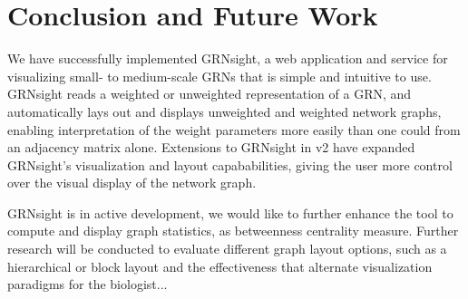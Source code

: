 \documentclass[sigconf,review]{acmart}
\begin{document}
\section{Conclusion and Future Work}
We have successfully implemented GRNsight, a web application and service for visualizing small- to medium-scale GRNs that is simple and intuitive to use. GRNsight reads a weighted or unweighted representation of a GRN, and automatically lays out and displays unweighted and weighted network graphs, enabling interpretation of the weight parameters more easily than one could from an adjacency matrix alone. Extensions to GRNsight in v2 have expanded GRNsight's visualization and layout capababilities, giving the user more control over the visual display of the network graph.

GRNsight is in active development, we would like to further enhance the tool to compute and display graph statistics, as betweenness centrality measure. Further research will be conducted to evaluate different graph layout options, such as a hierarchical or block layout and the effectiveness that alternate visualization paradigms for the biologist...


 
\end{document}
